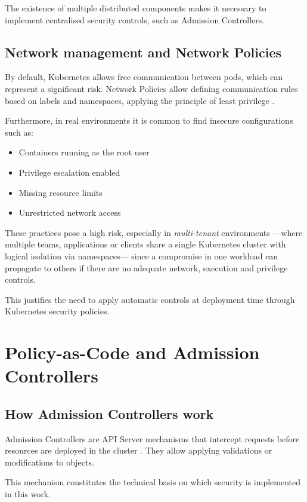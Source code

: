 The existence of multiple distributed components makes it necessary to implement centralised security controls, such as Admission Controllers.

\subsection{Network management and Network Policies}

By default, Kubernetes allows free communication between pods, which can represent a significant risk. Network Policies allow defining communication rules based on labels and namespaces, applying the principle of least privilege \cite{kubernetes_docs}.

Furthermore, in real environments it is common to find insecure configurations such as:

\begin{itemize}
\item Containers running as the root user
\item Privilege escalation enabled
\item Missing resource limits
\item Unrestricted network access
\end{itemize}

These practices pose a high risk, especially in \textit{multi-tenant} environments ---where multiple teams, applications or clients share a single Kubernetes cluster with logical isolation via namespaces--- since a compromise in one workload can propagate to others if there are no adequate network, execution and privilege controls.

This justifies the need to apply automatic controls at deployment time through Kubernetes security policies.

\section{Policy-as-Code and Admission Controllers}

\subsection{How Admission Controllers work}

Admission Controllers are API Server mechanisms that intercept requests before resources are deployed in the cluster \cite{kubernetes_docs}. They allow applying validations or modifications to objects.

This mechanism constitutes the technical basis on which security is implemented in this work.

